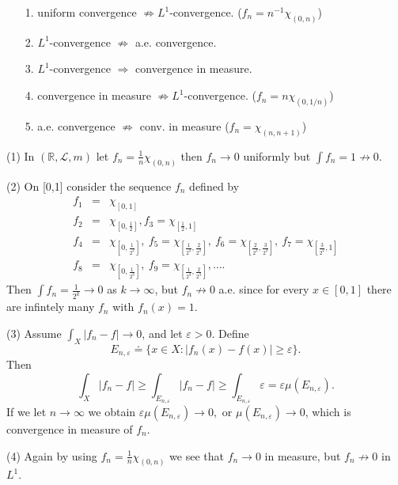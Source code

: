 \documentclass[12pt]{report}
\begin{document}
\begin{itemize}
\item[1.]  uniform convergence $\not\Longrightarrow L^1$-convergence.
($f_n = n^{-1}\chi_{(0, n)}$)
\item[2.]  $L^1$-convergence $\not\Longrightarrow$ a.e. convergence.
\item[3.] $L^1$-convergence $\Longrightarrow$ convergence in measure.
\item[4.]  convergence in measure $\not\Longrightarrow
L^1$-convergence. ($f_n = n\chi_{(0, 1/n)}$)
\item[5.]  a.e. convergence $\not\Longrightarrow$ conv. in measure 
($f_n = \chi_{(n, n+1)}$)
\end{itemize}


 (1)  In $(\mathbb{R}, \mathcal{L}, m)$ let $f_n =
\frac{1}{n} \chi_{(0, n)}$ then
$f_n
\longrightarrow 0$ uniformly but $\int f_n = 1 \not\rightarrow 0$.
 
\smallskip
\noindent (2)  On [0,1] consider the sequence $f_n$ defined by
\begin{eqnarray*} f_1 &=& \chi_{[0,1]}\\ f_2 &=& \chi_{\left [0,
\frac{1}{2} \right ]}, f_3 = \chi_{\left [ \frac{1}{2}, 1\right ]} \qquad
\\ f_4 &=& \chi_{\left [ 0, \frac{1}{2^2} \right ]}, \ f_5 = \chi_{\left [
\frac{1}{2^2},
\frac{2}{2^2} \right ]}, \ f_6 = \chi_{\left [ \frac{2}{2^2}, \frac{3}{2^2}
\right ]},
\ f_7 = \chi_{\left [ \frac{3}{2^2}, 1\right ]}\\ f_8 &=& \chi_{\left [
0,\frac{1}{2^3}\right ]} , \ f_9 = \chi_{\left [
\frac{1}{2^3},
\frac{2}{2^3} \right ]} , \dots.\end{eqnarray*} Then $\int f_n =
\frac{1}{2^k} \longrightarrow 0 $ as $k \to \infty$, but
$f_n
\not\longrightarrow 0$ a.e. since for every $x \in [0,1]$ there are
infintely many
$f_n$ with $f_n (x) = 1.$

\smallskip
\noindent (3)  Assume $\int_X |f_n - f| \longrightarrow 0$, and let
$\varepsilon > 0$.  Define
\[E_{n, \varepsilon} \doteq \{x \in X: |f_n (x) - f(x) | \ge \varepsilon \}.
\] Then
\[
\int_X |f_n - f| \ge \int_{E_{n, \varepsilon}} |f_n - f| \ge \int_{E_{n,
\varepsilon}}
\varepsilon = \varepsilon \mu(E_{n, \varepsilon}).
\] If we let $n \to \infty$ we obtain $\varepsilon \mu (E_{n, \varepsilon})
\longrightarrow 0, $ or $\mu(E_{n, \varepsilon}) \longrightarrow 0$,
which is convergence in measure of $f_n$.

\smallskip
\noindent (4)   Again by using $f_n = \frac{1}{n} \chi_{(0, n)}$ we see that
$f_n
\longrightarrow 0$ in measure, but $f_n \not\rightarrow 0 $ in $L^1$.
\end{document}
